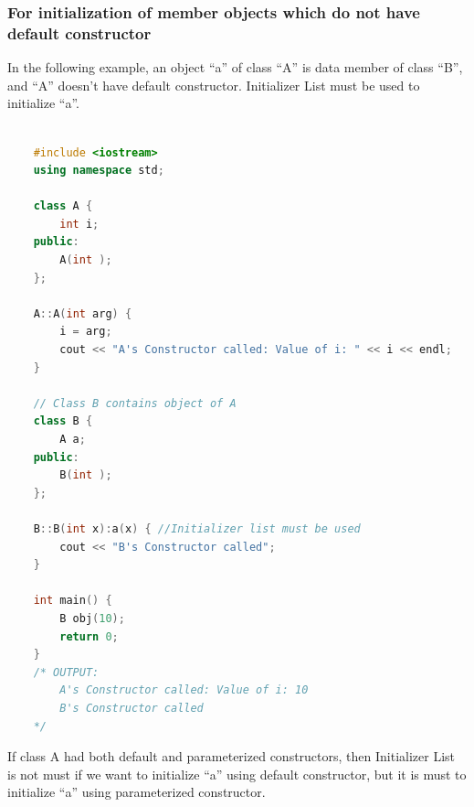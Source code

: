 \documentclass[12pt , a4paper]{article}
\begin{document}
	\subsubsection{For initialization of member objects which do not have default constructor}
	In the following example, an object “a” of class “A” is data member of class “B”, and “A” doesn’t have default constructor. Initializer List must be used to initialize “a”.\\
	\begin{lstlisting}[language=C++]

	#include <iostream>
	using namespace std;
	
	class A {
		int i;
	public:
		A(int );
	};
	
	A::A(int arg) {
		i = arg;
		cout << "A's Constructor called: Value of i: " << i << endl;
	}
	
	// Class B contains object of A
	class B {
		A a;
	public:
		B(int );
	};
	
	B::B(int x):a(x) { //Initializer list must be used
		cout << "B's Constructor called";
	}
	
	int main() {
		B obj(10);
		return 0;
	}
	/* OUTPUT:
		A's Constructor called: Value of i: 10
		B's Constructor called
	*/

	\end{lstlisting}

If class A had both default and parameterized constructors, then Initializer List is not must if we want to initialize “a” using default constructor, but it is must to initialize “a” using parameterized constructor. \\
\end{document}
